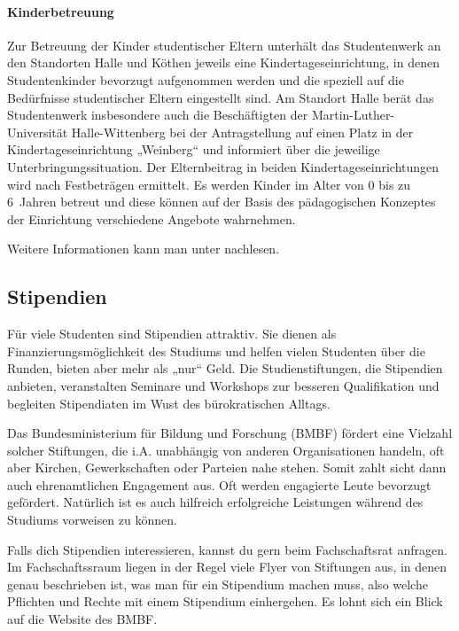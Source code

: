 \paragraph{Kinderbetreuung}
Zur Betreuung der Kinder studentischer Eltern unterhält das Studentenwerk an den Standorten Halle und Köthen jeweils eine Kindertageseinrichtung, in denen Studentenkinder bevorzugt aufgenommen werden und die speziell auf die Bedürfnisse studentischer Eltern eingestellt sind.
Am Standort Halle berät das Studentenwerk insbesondere auch die Beschäftigten der Martin-Luther-Universität Halle-Wittenberg bei der Antragstellung auf einen Platz in der Kindertageseinrichtung „Weinberg“ und informiert über die jeweilige Unterbringungssituation.
Der Elternbeitrag in beiden Kindertageseinrichtungen wird nach Festbeträgen ermittelt.
Es werden Kinder im Alter von 0 bis zu 6~Jahren betreut und diese können auf der Basis des pädagogischen Konzeptes der Einrichtung verschiedene Angebote wahrnehmen.

Weitere Informationen kann man unter
 nachlesen.

\subsection{Stipendien}

Für viele Studenten sind Stipendien attraktiv.
Sie dienen als Fi\-nan\-zier\-ungs\-mö\-glich\-keit des Studiums und helfen vielen Studenten über die Runden, bieten aber mehr als „nur“ Geld.
Die Studienstiftungen, die Stipendien anbieten, veranstalten Seminare und Workshops zur besseren Qualifikation und begleiten Stipendiaten im Wust des bürokratischen Alltags.

Das Bundesministerium für Bildung und Forschung (BMBF) fördert eine Vielzahl solcher Stiftungen, die i.A. unabhängig von anderen Organisationen handeln, oft aber Kirchen, Gewerkschaften oder Parteien nahe stehen.
Somit zahlt sicht dann auch ehrenamtlichen Engagement aus.
Oft werden engagierte Leute bevorzugt gefördert.
Natürlich ist es auch hilfreich erfolgreiche Leistungen während des Studiums vorweisen zu können.

Falls dich Stipendien interessieren, kannst du gern beim Fachschaftsrat anfragen.
Im Fachschaftssraum liegen in der Regel viele Flyer von Stiftungen aus, in denen genau beschrieben ist, was man für ein Stipendium machen muss, also welche Pflichten und Rechte mit einem Stipendium einhergehen.
Es lohnt sich ein Blick auf die Website des BMBF.


